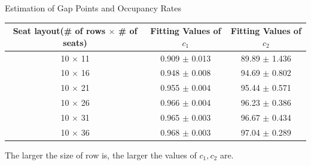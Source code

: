 \begin{frame}{Estimation of Gap Points and Occupancy Rates}
    \scriptsize
    \begin{table}[ht]
      \centering
      \begin{tabular}{|c|c|c|}
      \hline
       Seat layout(\# of rows $\times$ \# of seats) & Fitting Values of $c_1$ & Fitting Values of $c_2$  \\
      \hline
       10 $\times$ 11 & 0.909 $\pm$ 0.013  & 89.89 $\pm$ 1.436 \\
       10 $\times$ 16 & 0.948 $\pm$ 0.008  & 94.69 $\pm$ 0.802 \\
       10 $\times$ 21 & 0.955 $\pm$ 0.004 & 95.44 $\pm$ 0.571 \\
       10 $\times$ 26 & 0.966 $\pm$ 0.004 & 96.23 $\pm$ 0.386 \\
       10 $\times$ 31 & 0.965 $\pm$ 0.003 & 96.67 $\pm$ 0.434 \\
       10 $\times$ 36 & 0.968 $\pm$ 0.003 & 97.04 $\pm$ 0.289 \\
       \hline
      \end{tabular}
    \end{table}
    
    The larger the size of row is, the larger the values of $c_1, c_2$ are. 
    
  
  \end{frame}



    

        
